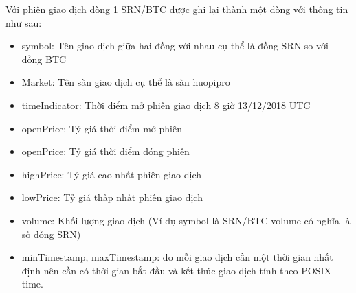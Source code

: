Với phiên giao dịch dòng 1 SRN/BTC được ghi lại thành một dòng với thông tin như sau:\\
 
\begin{itemize}
	\item symbol: Tên giao dịch giữa hai đồng với nhau cụ thể là đồng SRN so với đồng BTC
	\item Market: Tên sàn giao dịch cụ thể là sàn huopipro
	\item timeIndicator: Thời điểm mở phiên giao dịch 8 giờ 13/12/2018 UTC
	\item openPrice: Tỷ giá thời điểm mở phiên
	\item openPrice: Tỷ giá thời điểm đóng phiên
	\item highPrice: Tỷ giá cao nhất phiên giao dịch
	\item lowPrice: Tỷ giá thấp nhất phiên giao dịch
	\item volume: Khối lượng giao dịch (Ví dụ symbol là SRN/BTC volume có nghĩa là số đồng SRN)
	\item minTimestamp, maxTimestamp: do mỗi giao dịch cần một thời gian nhất định nên cần có thời gian bắt đầu và kết thúc giao dịch tính theo POSIX time.
\end{itemize}
